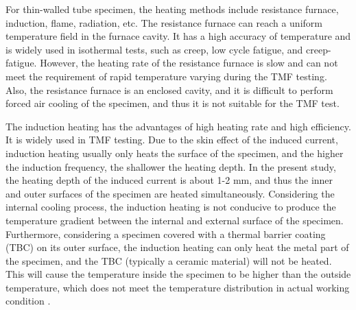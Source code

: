 \documentclass[preprint,5p,twocolumn,11pt,sort&compress]{elsarticle}
\begin{document}
For thin-walled tube specimen, the heating methods include resistance furnace, induction, flame, radiation, etc.
The resistance furnace can reach a uniform temperature field in the furnace cavity. It has a high accuracy of temperature and is widely used in isothermal tests, such as creep, low cycle fatigue, and creep-fatigue. However, the heating rate of the resistance furnace is slow and can not meet the requirement of rapid temperature varying during the TMF testing. Also, the resistance furnace is an enclosed cavity, and it is difficult to perform forced air cooling of the specimen, and thus it is not suitable for the TMF test.


The induction heating has the advantages of high heating rate and high efficiency. It is widely used in TMF testing.
Due to the skin effect of the induced current, induction heating usually only heats the surface of the specimen, and the higher the induction frequency, the shallower the heating depth.
In the present study, the heating depth of the induced current is about 1-2 mm, and thus the inner and outer surfaces of the specimen are heated simultaneously.
Considering the internal cooling process, the induction heating is not conducive to produce the temperature gradient between the internal and external surface of the specimen. Furthermore, considering a specimen covered with a thermal barrier coating (TBC) on its outer surface, the induction heating can only heat the metal part of the specimen, and the TBC (typically a ceramic material) will not be heated. This will cause the temperature inside the specimen to be higher than the outside temperature, which does not meet the temperature distribution in actual working condition \cite{BRENDEL2008234}.
\end{document}
